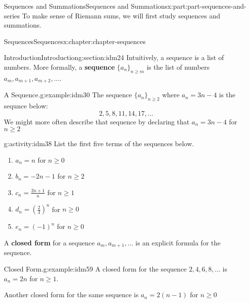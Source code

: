 \documentclass[oneside,10pt,]{book}
\newcommand{\terminology}[1]{\textbf{#1}}
\numberwithin{equation}{section}
\begin{document}
\begin{partptx}{Sequences and Summations}{}{Sequences and Summations}{}{}{x:part:part-sequences-and-series}
 To make sense of Riemann sums, we will first study sequences and summations. %
%
\typeout{************************************************}
\typeout{************************************************}
%
\begin{chapterptx}{Sequences}{}{Sequences}{}{}{x:chapter:chapter-sequences}
%
%
\typeout{************************************************}
\typeout{************************************************}
%
\begin{sectionptx}{Introduction}{}{Introduction}{}{}{g:section:idm24}
Intuitively, a sequence is a list of numbers. More formally, a \terminology{sequence} \(\{a_n\}_{n \geq m}\) is the list of numbers \(a_m, a_{m+1}, a_{m+2}, \dots\).%
\begin{example}{A Sequence.}{g:example:idm30}%
The sequence \(\{a_n\}_{n \geq 2}\) where \(a_n = 3n-4\) is the sequnce below:%
\begin{equation*}
2, 5, 8, 11, 14, 17, \dots
\end{equation*}
We might more often describe that sequence by declaring that \(a_n = 3n-4\) for \(n \geq 2\)%
\end{example}
\begin{activity}{}{g:activity:idm38}%
List the first five terms of the sequences below.%
\begin{enumerate}[font=\bfseries,label=(\alph*),ref=\alph*]
\item{}\(a_n = n\) for \(n \geq 0\)\item{}\(b_n = -2n-1\) for \(n \geq 2\)\item{}\(c_n = \frac{2n+1}{n}\) for \(n \geq 1\)\item{}\(d_n = \left(\frac{2}{3}\right)^n\) for \(n \geq 0\)\item{}\(e_n = (-1)^n\) for \(n \geq 0\)\end{enumerate}
\end{activity}
A \terminology{closed form} for a sequence \(a_m, a_{m+1}, \dots\) is an explicit formula for the sequence.%
\begin{example}{Closed Form.}{g:example:idm59}%
A closed form for the sequence \(2, 4, 6, 8, \dots\) is \(a_n = 2n\) for \(n \geq 1\).%
\par
Another closed form for the same sequence is \(a_n = 2(n-1)\) for \(n \geq 0\)%
\end{example}

\end{sectionptx}
\end{chapterptx}
\end{partptx}
\end{document}

